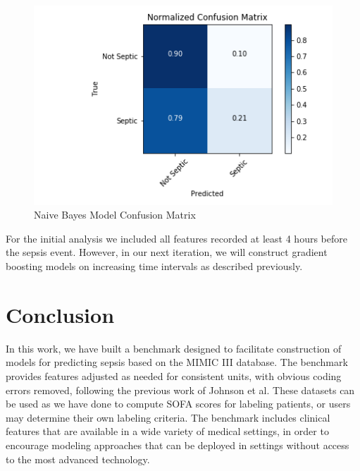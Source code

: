 \documentclass{amia}
\begin{document}
\begin{figure}[H]
\centering
\includegraphics[scale=0.6]{bayesConfusion}
\caption{Naive Bayes Model Confusion Matrix}\label{fig:confusion}
\end{figure}

For the initial analysis we included all features recorded at least 4 hours 
before the sepsis event.  However, in our next iteration, we will construct gradient boosting models on increasing
time intervals as described previously. 

\section{Conclusion}
In this work, we have built a benchmark designed to facilitate construction of models for predicting sepsis
based on the MIMIC III database.  The benchmark provides features adjusted as needed for consistent units, with obvious coding
errors removed, following the previous work of Johnson et al.\cite{johnson2017}  These datasets can be used as we have done 
to compute SOFA scores for labeling patients, or users may determine their own labeling criteria.  The benchmark includes
clinical features that are available in a wide variety of medical settings, in order to encourage modeling approaches that can be
deployed in settings without access to the most advanced technology.
\end{document}
